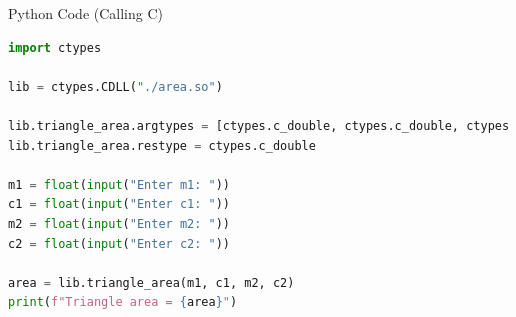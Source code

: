 \documentclass{beamer}
\begin{document}
\begin{frame}[fragile]{Python Code (Calling C)}
\begin{lstlisting}[language=Python]
import ctypes

lib = ctypes.CDLL("./area.so")

lib.triangle_area.argtypes = [ctypes.c_double, ctypes.c_double, ctypes.c_double, ctypes.c_double]
lib.triangle_area.restype = ctypes.c_double

m1 = float(input("Enter m1: "))
c1 = float(input("Enter c1: "))
m2 = float(input("Enter m2: "))
c2 = float(input("Enter c2: "))

area = lib.triangle_area(m1, c1, m2, c2)
print(f"Triangle area = {area}")
\end{lstlisting}
\end{frame}
\end{document}
